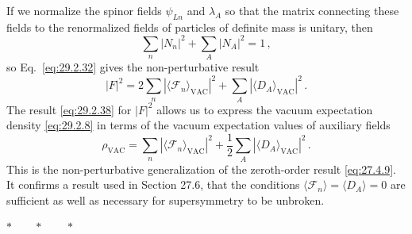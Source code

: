 If we normalize the spinor fields \(\psi_{Ln}\) and \(\lambda_A\) so that
the matrix connecting these fields to the renormalized fields of particles
of definite mass is unitary, then
\begin{equation}
  \sum_n\lvert N_n\rvert^2+\sum_A\lvert N_A\rvert^2=1\,,
  \tag{29.2.37}\label{eq:29.2.37}
\end{equation}
so Eq.~\eqref{eq:29.2.32} gives the non-perturbative result
\begin{equation}
  \lvert F\rvert^2
  =
  2\sum_n
  \left\lvert\langle\mathcal{F}_n\rangle_{\mathrm{VAC}}\right\rvert^2
  +\sum_A
  \left\lvert\langle D_A\rangle_{\mathrm{VAC}}\right\rvert^2\,.
  \tag{29.2.38}\label{eq:29.2.38}
\end{equation}
The result \eqref{eq:29.2.38} for \(\lvert F\rvert^2\) allows us to
express the vacuum expectation density \eqref{eq:29.2.8} in terms of the
vacuum expectation values of auxiliary fields
\begin{equation}
  \rho_{\mathrm{VAC}}
  =
  \sum_n
  \left\lvert\langle\mathcal{F}_n\rangle_{\mathrm{VAC}}\right\rvert^2
  +\frac12\sum_A
  \left\lvert\langle D_A\rangle_{\mathrm{VAC}}\right\rvert^2\,.
  \tag{29.2.39}\label{eq:29.2.39}
\end{equation}
This is the non-perturbative generalization of the zeroth-order result
\eqref{eq:27.4.9}. It confirms a result used in Section 27.6, that the
conditions \(\langle\mathcal{F}_n\rangle=\langle D_A\rangle=0\) are
sufficient as well as necessary for supersymmetry to be unbroken.

\begin{center}
\(\ast\qquad\ast\qquad\ast\)
\end{center}

